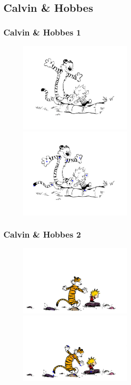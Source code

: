 \documentclass[a4paper]{beamer}
\begin{document}
\subsection{Calvin \& Hobbes}
\begin{frame}
	\frametitle{Calvin \& Hobbes 1}
	\begin{figure}
		\centering
		\includegraphics[width=0.5\textwidth,keepaspectratio]{pic/results/calvin1}
		\includegraphics[width=0.5\textwidth,keepaspectratio]{pic/results/calvin2}
	\end{figure}
\end{frame}

\begin{frame}
	\frametitle{Calvin \& Hobbes 2}
	\begin{figure}
		\centering
		\includegraphics[width=0.5\textwidth,keepaspectratio]{pic/results/calvin-hobbes1}
		\includegraphics[width=0.5\textwidth,keepaspectratio]{pic/results/calvin-hobbes2}
	\end{figure}
\end{frame}
\end{document}
